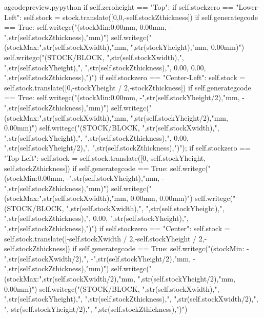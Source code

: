 \documentclass{ltxdoc}
\begin{document}
\lstset{firstnumber=\thegcpy}
\begin{writecode}{a}{gcodepreview.py}{python}
        if self.zeroheight == "Top":
            if self.stockzero == "Lower-Left":
                self.stock = stock.translate([0,0,-self.stockZthickness])
                if self.generategcode == True:
                    self.writegc("(stockMin:0.00mm, 0.00mm, -",str(self.stockZthickness),"mm)")
                    self.writegc("(stockMax:",str(self.stockXwidth),"mm, ",str(stockYheight),"mm, 0.00mm)")
                    self.writegc("(STOCK/BLOCK, ",str(self.stockXwidth),", ",str(self.stockYheight),", ",str(self.stockZthickness),", 0.00, 0.00, ",str(self.stockZthickness),")")
            if self.stockzero == "Center-Left":
                self.stock = self.stock.translate([0,-stockYheight / 2,-stockZthickness])
                if self.generategcode == True:
                    self.writegc("(stockMin:0.00mm, -",str(self.stockYheight/2),"mm, -",str(self.stockZthickness),"mm)")
                    self.writegc("(stockMax:",str(self.stockXwidth),"mm, ",str(self.stockYheight/2),"mm, 0.00mm)")
                    self.writegc("(STOCK/BLOCK, ",str(self.stockXwidth),", ",str(self.stockYheight),", ",str(self.stockZthickness),", 0.00, ",str(self.stockYheight/2),", ",str(self.stockZthickness),")");
            if self.stockzero == "Top-Left":
                self.stock = self.stock.translate([0,-self.stockYheight,-self.stockZthickness])
                if self.generategcode == True:
                    self.writegc("(stockMin:0.00mm, -",str(self.stockYheight),"mm, -",str(self.stockZthickness),"mm)")
                    self.writegc("(stockMax:",str(self.stockXwidth),"mm, 0.00mm, 0.00mm)")
                    self.writegc("(STOCK/BLOCK, ",str(self.stockXwidth),", ",str(self.stockYheight),", ",str(self.stockZthickness),", 0.00, ",str(self.stockYheight),", ",str(self.stockZthickness),")")
            if self.stockzero == "Center":
                self.stock = self.stock.translate([-self.stockXwidth / 2,-self.stockYheight / 2,-self.stockZthickness])
                if self.generategcode == True:
                    self.writegc("(stockMin: -",str(self.stockXwidth/2),", -",str(self.stockYheight/2),"mm, -",str(self.stockZthickness),"mm)")
                    self.writegc("(stockMax:",str(self.stockXwidth/2),"mm, ",str(self.stockYheight/2),"mm, 0.00mm)")
                    self.writegc("(STOCK/BLOCK, ",str(self.stockXwidth),", ",str(self.stockYheight),", ",str(self.stockZthickness),", ",str(self.stockXwidth/2),", ", str(self.stockYheight/2),", ",str(self.stockZthickness),")")

\end{writecode}
\end{document}
